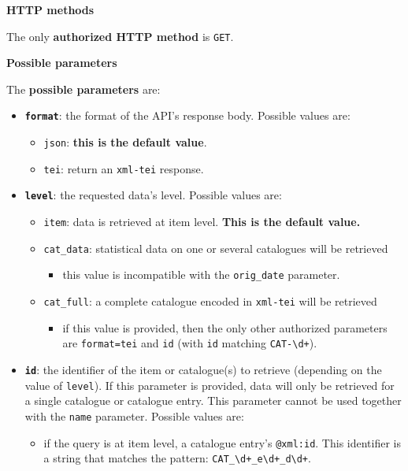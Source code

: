 \noindent{}\textbf{HTTP methods}

The only \textbf{authorized HTTP method} is \texttt{GET}.

\noindent{}\textbf{Possible parameters}

The \textbf{possible parameters} are:

\begin{itemize}
\item \textbf{\texttt{format}}: the format of the API's response body. Possible values are:
\begin{itemize} 
 \item \texttt{json}: \textbf{this is the default value}.
\item \texttt{tei}: return an \texttt{xml-tei} response.
\end{itemize}
\item \textbf{\texttt{level}}: the requested data's level. Possible values are:
\begin{itemize} 
 \item \texttt{item}: data is retrieved at item level. \textbf{This is the default value.}
\item \texttt{cat\_data}: statistical data on one or several catalogues will be retrieved
\begin{itemize} 
 \item this value is incompatible with the \texttt{orig\_date} parameter.
\end{itemize}
\item \texttt{cat\_full}: a complete catalogue encoded in \texttt{xml-tei} will be retrieved
\begin{itemize} 
 \item if this value is provided, then the only other authorized parameters are 		 \texttt{format=tei} and \texttt{id} (with \texttt{id} matching \texttt{CAT-\textbackslash{}d+}).
\end{itemize}
\end{itemize}
\item \textbf{\texttt{id}}: the identifier of the item or catalogue(s) to retrieve (depending on the value of \texttt{level}). If this parameter is provided, data will only be retrieved for a single catalogue or catalogue entry. This parameter cannot be used together with the \texttt{name} parameter. Possible values are:
\begin{itemize} 
 \item if the query is at item level, a catalogue entry's \texttt{@xml:id}. This identifier 	 is a string that matches the pattern: \texttt{CAT\_\textbackslash{}d+\_e\textbackslash{}d+\_d\textbackslash{}d+}.

\end{itemize}
\end{itemize}
